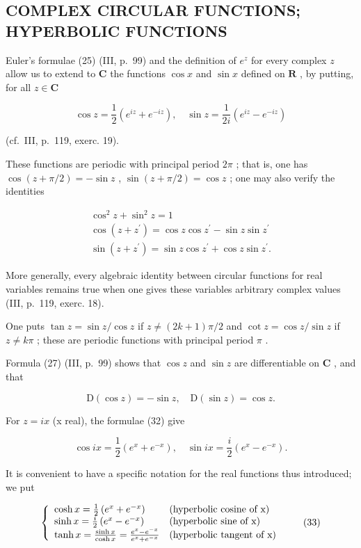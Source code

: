 \subsection{COMPLEX CIRCULAR FUNCTIONS; HYPERBOLIC FUNCTIONS}

Euler's formulae (25) (III, p.~99) and the definition of \(e^z\) for every complex \(z\) allow us to extend to \(\mathbf{C}\) the functions \(\cos x\) and \(\sin x\) defined on \(\mathbf{R}\) , by putting, for all \(z \in \mathbf{C}\)

\[
\cos z = \frac {1}{2} \left(e ^ {i z} + e ^ {- i z}\right), \quad \sin z = \frac {1}{2 i} \left(e ^ {i z} - e ^ {- i z}\right)\tag{32}
\]

(cf.~III, p.~119, exerc. 19).

These functions are periodic with principal period \(2\pi\) ; that is, one has \(\cos(z + \pi/2) = -\sin z\) , \(\sin(z + \pi/2) = \cos z\) ; one may also verify the identities

\[
\begin{array}{c} \cos^ {2} z + \sin^ {2} z = 1 \\ \cos (z + z ^ {\prime}) = \cos z \cos z ^ {\prime} - \sin z \sin z ^ {\prime} \\ \sin (z + z ^ {\prime}) = \sin z \cos z ^ {\prime} + \cos z \sin z ^ {\prime}. \end{array}
\]

More generally, every algebraic identity between circular functions for real variables remains true when one gives these variables arbitrary complex values (III, p.~119, exerc. 18).

One puts \(\tan z = \sin z/\cos z\) if \(z \neq (2k + 1)\pi/2\) and \(\cot z = \cos z/\sin z\) if \(z \neq k\pi\) ; these are periodic functions with principal period \(\pi\) .

Formula (27) (III, p.~99) shows that \(\cos z\) and \(\sin z\) are differentiable on \(\mathbf{C}\) , and that

\[
\mathrm{D} (\cos z) = - \sin z, \quad \mathrm{D} (\sin z) = \cos z.
\]

For \(z = ix\) (x real), the formulae (32) give

\[
\cos i x = \frac {1}{2} \left(e ^ {x} + e ^ {- x}\right), \quad \sin i x = \frac {i}{2} \left(e ^ {x} - e ^ {- x}\right).
\]

It is convenient to have a specific notation for the real functions thus introduced; we put

\[
\left\{ \begin{array}{l l} \cosh x = \frac {1}{2} \left(e ^ {x} + e ^ {- x}\right) & \text {(hyperbolic cosine of x)} \\ \sinh x = \frac {i}{2} \left(e ^ {x} - e ^ {- x}\right) & \text {(hyperbolic sine of x)} \\ \tanh x = \frac {\sinh x}{\cosh x} = \frac {e ^ {x} - e ^ {- x}}{e ^ {x} + e ^ {- x}} & \text {(hyperbolic tangent of x)} \end{array} \right.\tag{33}
\]

